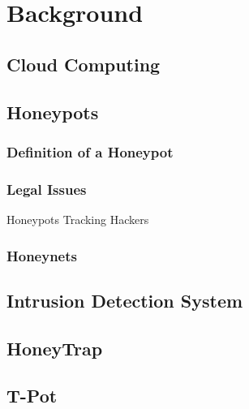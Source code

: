 \chapter{Background}

\section{Cloud Computing}

\section{Honeypots}

\subsection{Definition of a Honeypot}

\subsection{Legal Issues}

Honeypots Tracking Hackers

\subsection{Honeynets}

\section{Intrusion Detection System}


\section{HoneyTrap}

\section{T-Pot}
